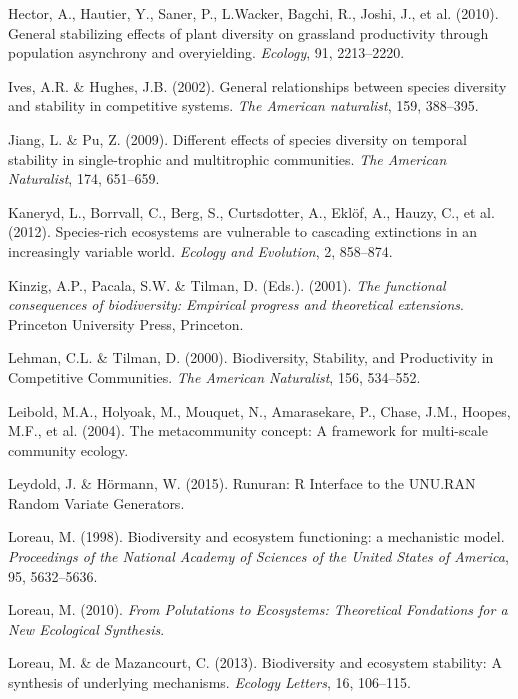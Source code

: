 \documentclass[12pt,]{article}
\begin{document}
\hypertarget{ref-Hector2010}{}
Hector, A., Hautier, Y., Saner, P., L.Wacker, Bagchi, R., Joshi, J., et
al. (2010). General stabilizing effects of plant diversity on grassland
productivity through population asynchrony and overyielding.
\emph{Ecology}, 91, 2213--2220.

\hypertarget{ref-Ives2002b}{}
Ives, A.R. \& Hughes, J.B. (2002). General relationships between species
diversity and stability in competitive systems. \emph{The American
naturalist}, 159, 388--395.

\hypertarget{ref-Jiang2009}{}
Jiang, L. \& Pu, Z. (2009). Different effects of species diversity on
temporal stability in single-trophic and multitrophic communities.
\emph{The American Naturalist}, 174, 651--659.

\hypertarget{ref-Kaneryd2012}{}
Kaneryd, L., Borrvall, C., Berg, S., Curtsdotter, A., Eklöf, A., Hauzy,
C., et al. (2012). Species-rich ecosystems are vulnerable to cascading
extinctions in an increasingly variable world. \emph{Ecology and
Evolution}, 2, 858--874.

\hypertarget{ref-Kinzig2001}{}
Kinzig, A.P., Pacala, S.W. \& Tilman, D. (Eds.). (2001). \emph{The
functional consequences of biodiversity: Empirical progress and
theoretical extensions}. Princeton University Press, Princeton.

\hypertarget{ref-Lehman2000}{}
Lehman, C.L. \& Tilman, D. (2000). Biodiversity, Stability, and
Productivity in Competitive Communities. \emph{The American Naturalist},
156, 534--552.

\hypertarget{ref-Leibold2004}{}
Leibold, M.A., Holyoak, M., Mouquet, N., Amarasekare, P., Chase, J.M.,
Hoopes, M.F., et al. (2004). The metacommunity concept: A framework for
multi-scale community ecology.

\hypertarget{ref-Leydold2015}{}
Leydold, J. \& Hörmann, W. (2015). Runuran: R Interface to the UNU.RAN
Random Variate Generators.

\hypertarget{ref-Loreau1998}{}
Loreau, M. (1998). Biodiversity and ecosystem functioning: a mechanistic
model. \emph{Proceedings of the National Academy of Sciences of the
United States of America}, 95, 5632--5636.

\hypertarget{ref-Loreau2010}{}
Loreau, M. (2010). \emph{From Polutations to Ecosystems: Theoretical
Fondations for a New Ecological Synthesis}.

\hypertarget{ref-Loreau2013}{}
Loreau, M. \& de Mazancourt, C. (2013). Biodiversity and ecosystem
stability: A synthesis of underlying mechanisms. \emph{Ecology Letters},
16, 106--115.
\end{document}
